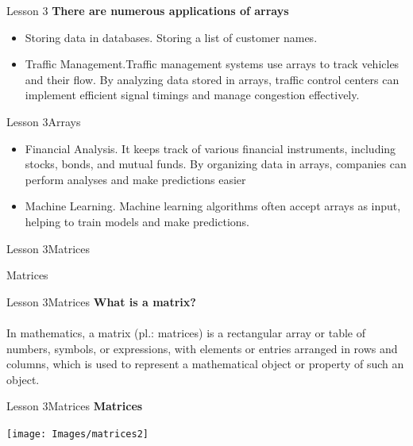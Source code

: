 \documentclass[aspectratio=1610]{beamer}
\begin{document}
\begin{frame}{Lesson 3}{}
\LARGE
\textbf{There are numerous applications of arrays}\\
\begin{itemize}
    \item Storing data in databases. Storing a list of customer names.  
    \item Traffic Management.Traffic management systems use arrays to track vehicles and
    their flow. By analyzing data stored in arrays, traffic control centers can implement
    efficient signal timings and manage congestion effectively.
\end{itemize}
\end{frame}



\begin{frame}{Lesson 3}{Arrays}
\LARGE
\begin{itemize}
    \item Financial Analysis. It keeps track of various financial instruments, including stocks, bonds, and mutual funds. By organizing data in arrays, companies can perform analyses and make predictions easier 
    \item Machine Learning. Machine learning algorithms often accept arrays as input, helping to train models and make predictions.
\end{itemize}
\end{frame}



\begin{frame}{Lesson 3}{Matrices}
\begin{center}
\Huge Matrices
\end{center}
\end{frame}


\begin{frame}{Lesson 3}{Matrices}
\LARGE
\textbf{What is a matrix?}\\~\\
In mathematics, a matrix (pl.: matrices) is a rectangular array or table of numbers,
symbols, or expressions, with elements or entries arranged in rows and columns, which is
used to represent a mathematical object or property of such an object.
\end{frame}


\begin{frame}{Lesson 3}{Matrices}
\LARGE
\textbf{Matrices}
\begin{center}
\texttt{[image: Images/matrices2]}
\end{center}
\end{frame}
\end{document}
